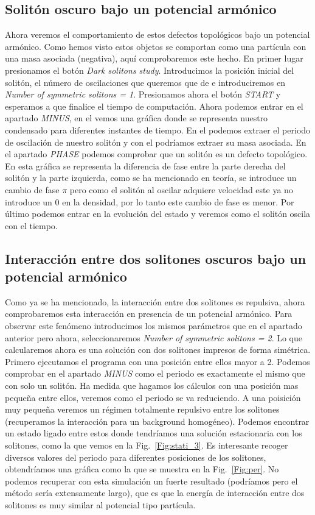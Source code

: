 \subsection{Solit\'on oscuro bajo un potencial arm\'onico}
Ahora veremos el comportamiento de estos defectos topol\'ogicos bajo un potencial arm\'onico. Como hemos visto estos objetos se comportan como una part\'icula con una masa asociada (negativa), aqu\'i comprobaremos este hecho. En primer lugar presionamos el bot\'on \textit{Dark solitons study}. Introducimos la posici\'on inicial del solit\'on, el n\'umero de oscilaciones que queremos que de e introduciremos en \textit{Number of symmetric solitons = 1}. Presionamos ahora el bot\'on \textit{START} y esperamos a que finalice el tiempo de computaci\'on. Ahora podemos entrar en el apartado \textit{MINUS}, en el vemos una gr\'afica donde se representa nuestro condensado para diferentes instantes de tiempo. En el podemos extraer el periodo de oscilaci\'on de nuestro solit\'on y con el podr\'iamos extraer su masa asociada. En el apartado \textit{PHASE} podemos comprobar que un solit\'on es un defecto topol\'ogico. En esta gr\'afica se representa la diferencia de fase entre la parte derecha del solit\'on y la parte izquierda, como se ha mencionado en teor\'ia, se introduce un cambio de fase $\pi$ pero como el solit\'on al oscilar adquiere velocidad este ya no introduce un 0 en la densidad, por lo tanto este cambio de fase es menor. Por \'ultimo podemos entrar en la evoluci\'on del estado y veremos como el solit\'on oscila con el tiempo.

\subsection{Interacci\'on entre dos solitones oscuros bajo un potencial arm\'onico}
 Como ya se ha mencionado, la interacci\'on entre dos solitones es repulsiva, ahora comprobaremos esta interacci\'on en presencia de un potencial arm\'onico. Para observar este fen\'omeno introducimos los mismos par\'ametros que en el apartado anterior pero ahora, seleccionaremos \textit{Number of symmetric solitons = 2}. Lo que calcularemos ahora es una soluci\'on con dos solitones impresos de forma sim\'etrica. Primero ejecutamos el programa con una posici\'on entre ellos mayor a 2. Podemos comprobar en el apartado \textit{MINUS} como el periodo es exactamente el mismo que con solo un solit\'on. Ha medida que hagamos los c\'alculos con una posici\'on mas pequeña entre ellos, veremos como el periodo se va reduciendo. A una poisici\'on muy pequeña veremos un r\'egimen totalmente repulsivo entre los solitones (recuperamos la interacci\'on para un background homogéneo). Podemos encontrar un estado ligado entre estos donde tendríamos una soluci\'on estacionaria con los solitones, como la que vemos en la Fig.~\ref{Fig:stati_3}. Es interesante recoger diversos valores del periodo para diferentes posiciones de los solitones, obtendr\'iamos una gr\'afica como la que se muestra en la Fig.~\ref{Fig:per}. No podemos recuperar con esta simulaci\'on un fuerte resultado (podr\'iamos pero el m\'etodo ser\'ia extensamente largo), que es que la energ\'ia de interacci\'on entre dos solitones es muy similar al potencial tipo part\'icula.
 
